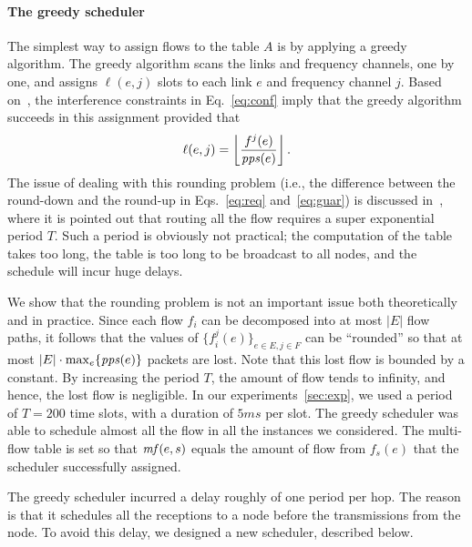 \documentclass[12pt]{article}
\newenvironment{proof sketch}[1]{\noindent {\emph{Proof sketch of #1:}}}{\hfill \qed}
\newcommand{\pps}{\text{\emph{pps}}}
\newcommand{\mf}{\text{\emph{mf}}}
\begin{document}
\paragraph{The greedy scheduler}
  The simplest way to assign flows to the table $A$ is by applying a
  greedy algorithm.  The greedy algorithm scans the links and
  frequency channels, one by one, and assigns $\ell(e,j)$ slots to
  each link $e$ and frequency channel $j$.  Based
  on~\cite{alicherry2005joint11,kumar2004end,buragohain2007improved},
  the interference constraints in Eq.~\ref{eq:conf} imply that the
  greedy algorithm succeeds in this assignment provided that
\begin{align}\label{eq:guar}
 \ell(e,j) = \left\lfloor \frac{f^j(e)}{\pps(e)} \right\rfloor.
  \end{align}
  The issue of dealing with this rounding problem (i.e., the
  difference between the round-down and the round-up in Eqs.~\ref{eq:req} and~\ref{eq:guar}) is discussed
  in~\cite{wan2009multiflows}, where it is pointed out that routing
  all the flow requires a super exponential period $T$. Such a period
  is obviously not practical; the computation of the table takes too
  long, the table is too long to be broadcast to all nodes, and
  the schedule will incur huge delays.

  We show that the rounding problem is not an important issue both
  theoretically and in practice.  Since each flow $f_i$ can be
  decomposed into at most $|E|$ flow paths, it follows that the values
  of $\{f^j_i(e)\}_{e\in E, j\in F}$ can be ``rounded'' so that at
  most $|E|\cdot \max_e \{\pps(e)\}$ packets are lost.  Note that this
  lost flow is bounded by a constant. By increasing the period $T$,
  the amount of flow tends to infinity, and hence, the lost flow is
  negligible. In our experiments~\ref{sec:exp}, we used a period of
  $T=200$ time slots, with a duration of $5ms$ per slot. The greedy
  scheduler was able to schedule almost all the flow in all the
  instances we considered.  The multi-flow table is set so that
  $\mf(e,s)$ equals the amount of flow from $f_s(e)$ that the
  scheduler successfully assigned.

 The greedy scheduler incurred a delay roughly of
  one period per hop. The reason is that it schedules all the
  receptions to a node before the transmissions from the node. To
  avoid this delay, we designed a new scheduler, described below.
\end{document}
